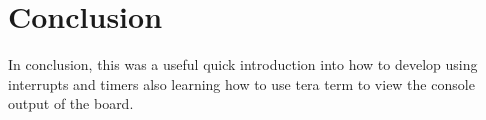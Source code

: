 \documentclass[a4paper,12pt]{scrartcl}
\begin{document}
	\section{Conclusion}
	{
		In conclusion, this was a useful quick introduction into how to develop using interrupts and timers also learning how to use tera term to view the console output of the board.
	}
	
	\newpage
	
	\printbibliography[heading=bibintoc,title=References]
\end{document}
